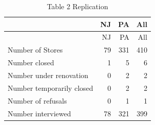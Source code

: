 \documentclass[
]{article}
\begin{document}
\begin{longtable}[]{@{}lrrr@{}}
\caption{Table 2 Replication}\tabularnewline
\toprule\noalign{}
& NJ & PA & All \\
\midrule\noalign{}
\endfirsthead
\toprule\noalign{}
& NJ & PA & All \\
\midrule\noalign{}
\endhead
\bottomrule\noalign{}
\endlastfoot
Number of Stores & 79 & 331 & 410 \\
Number closed & 1 & 5 & 6 \\
Number under renovation & 0 & 2 & 2 \\
Number temporarily closed & 0 & 2 & 2 \\
Number of refusals & 0 & 1 & 1 \\
Number interviewed & 78 & 321 & 399 \\
\end{longtable}
\end{document}
